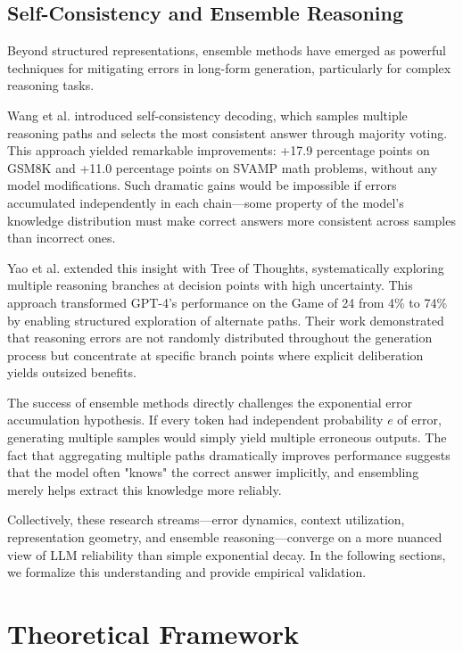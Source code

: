 \documentclass{article}
\begin{document}
\subsection{Self-Consistency and Ensemble Reasoning}

Beyond structured representations, ensemble methods have emerged as powerful techniques for mitigating errors in long-form generation, particularly for complex reasoning tasks.

Wang et al. \citep{wang2023self} introduced self-consistency decoding, which samples multiple reasoning paths and selects the most consistent answer through majority voting. This approach yielded remarkable improvements: +17.9 percentage points on GSM8K and +11.0 percentage points on SVAMP math problems, without any model modifications. Such dramatic gains would be impossible if errors accumulated independently in each chain—some property of the model's knowledge distribution must make correct answers more consistent across samples than incorrect ones.

Yao et al. \citep{yao2023tree} extended this insight with Tree of Thoughts, systematically exploring multiple reasoning branches at decision points with high uncertainty. This approach transformed GPT-4's performance on the Game of 24 from 4\% to 74\% by enabling structured exploration of alternate paths. Their work demonstrated that reasoning errors are not randomly distributed throughout the generation process but concentrate at specific branch points where explicit deliberation yields outsized benefits.

The success of ensemble methods directly challenges the exponential error accumulation hypothesis. If every token had independent probability $e$ of error, generating multiple samples would simply yield multiple erroneous outputs. The fact that aggregating multiple paths dramatically improves performance suggests that the model often "knows" the correct answer implicitly, and ensembling merely helps extract this knowledge more reliably.

Collectively, these research streams—error dynamics, context utilization, representation geometry, and ensemble reasoning—converge on a more nuanced view of LLM reliability than simple exponential decay. In the following sections, we formalize this understanding and provide empirical validation.

\section{Theoretical Framework}
\end{document}
